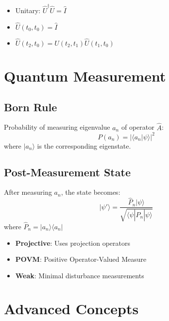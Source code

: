 \documentclass{a3cheatsheet}
\begin{document}
\begin{multicols}{3}
\begin{infobox}
\begin{itemize}
    \item Unitary: $\hat{U}^\dagger\hat{U} = \hat{I}$
    \item $\hat{U}(t_0,t_0) = \hat{I}$
    \item $\hat{U}(t_2,t_0) = \hat{U}(t_2,t_1)\hat{U}(t_1,t_0)$
\end{itemize}
\end{infobox}

\section{Quantum Measurement}

\subsection{Born Rule}

\begin{formulabox}
Probability of measuring eigenvalue $a_n$ of operator $\hat{A}$:
$$P(a_n) = |\langle a_n|\psi\rangle|^2$$
where $|a_n\rangle$ is the corresponding eigenstate.
\end{formulabox}

\subsection{Post-Measurement State}

\begin{formulabox}
After measuring $a_n$, the state becomes:
$$|\psi'\rangle = \frac{\hat{P}_n|\psi\rangle}{\sqrt{\langle\psi|\hat{P}_n|\psi\rangle}}$$
where $\hat{P}_n = |a_n\rangle\langle a_n|$
\end{formulabox}

\begin{itemize}
    \item \textbf{Projective}: Uses projection operators
    \item \textbf{POVM}: Positive Operator-Valued Measure
    \item \textbf{Weak}: Minimal disturbance measurements
\end{itemize}

\section{Advanced Concepts}


\end{multicols}
\end{document}
